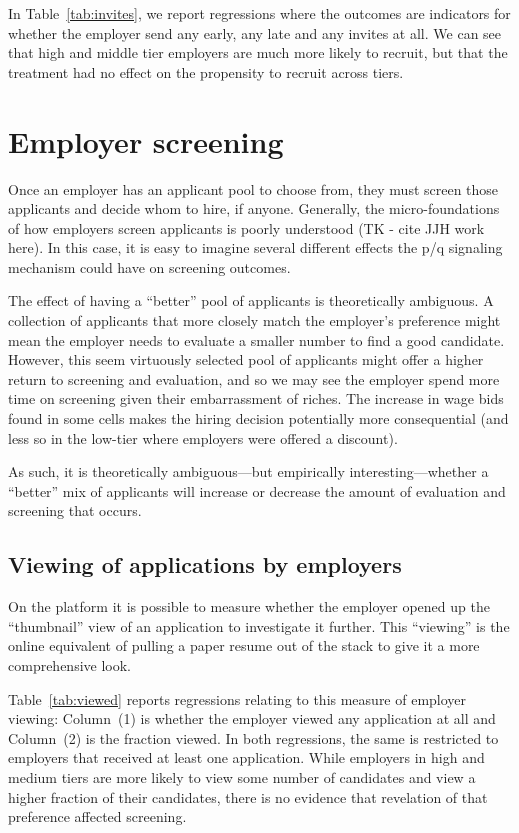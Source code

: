 \documentclass[prodmode,acmec]{ec-acmsmall}
\newcommand{\important}[1]{#1}
\begin{document}
In Table~\ref{tab:invites}, we report regressions where the outcomes are indicators for whether the employer send any early, any late and any invites at all. 
\important{We can see that high and middle tier employers are much more likely to recruit, but that the treatment had no effect on the propensity to recruit across tiers.}


\section{Employer screening} \label{sec:screening}
Once an employer has an applicant pool to choose from, they must screen those applicants and decide whom to hire, if anyone.
Generally, the micro-foundations of how employers screen applicants is poorly understood (TK - cite JJH work here).
In this case, it is easy to imagine several different effects the p/q signaling mechanism could have on screening outcomes.

The effect of having a ``better'' pool of applicants is theoretically ambiguous.
A collection of applicants that more closely match the employer's preference might mean the employer needs to evaluate a smaller number to find a good candidate. 
However, this seem virtuously selected pool of applicants might offer a higher return to screening and evaluation, and so we may see the employer spend more time on screening given their embarrassment of riches. 
The increase in wage bids found in some cells makes the hiring decision potentially more consequential (and less so in the low-tier where employers were offered a discount). 

As such, it is theoretically ambiguous---but empirically interesting---whether a ``better'' mix of applicants will increase or decrease the amount of evaluation and screening that occurs.

\subsection{Viewing of applications by employers}

On the platform it is possible to measure whether the employer opened up the ``thumbnail'' view of an application to investigate it further.
This ``viewing'' is the online equivalent of pulling a paper resume out of the stack to give it a more comprehensive look.

Table~\ref{tab:viewed} reports regressions relating to this measure of employer viewing:
Column~(1) is whether the employer viewed any application at all and Column~(2) is the fraction viewed.
In both regressions, the same is restricted to employers that received at least one application. 
\important{While employers in high and medium tiers are more likely to view some number of candidates and view a higher fraction of their candidates, there is no evidence that revelation of that preference affected screening.} 
\end{document}
